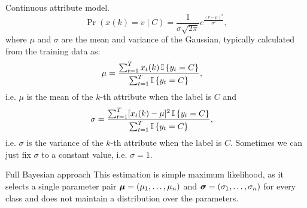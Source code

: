 \begin{frame}
  \begin{block}{Continuous attribute model.}
    \[
      \Pr(x(k) = v \mid C) = \frac{1}{\sigma \sqrt{2 \pi}} e^{\frac{(v -
          \mu)^2}{\sigma^2}},
    \]
    where $\mu$ and $\sigma$ are the mean and variance of the
    Gaussian, typically calculated from the training data as:
    \begin{align*}
      \mu &=   \frac{\sum_{t=1}^T x_t(k) \mathop{\mbox{\ensuremath{\mathbb{I}}}}\left\{y_t = C\right\}}
            {\sum_{t=1}^T \mathop{\mbox{\ensuremath{\mathbb{I}}}}\left\{y_t = C\right\}},
    \end{align*}
    i.e. $\mu$ is the mean of the $k$-th attribute when the label is
    $C$ and
    \begin{align*}
      \sigma &=   \frac{\sum_{t=1}^T [x_t(k) - \mu]^2 \mathop{\mbox{\ensuremath{\mathbb{I}}}}\left\{y_t = C\right\}}
               {\sum_{t=1}^T \mathop{\mbox{\ensuremath{\mathbb{I}}}}\left\{y_t = C\right\}},
    \end{align*}
    i.e. $\sigma$ is the variance of the $k$-th attribute when the
    label is $C$.  Sometimes we can just fix $\sigma$ to a constant
    value, i.e. $\sigma = 1$.
  \end{block}

  \begin{alertblock}{Full Bayesian approach}
    This estimation is simple maximum likelihood, as it selects a single parameter pair $\vectorsym{\mu} = (\mu_1, \ldots, \mu_n)$ and $\vectorsym{\sigma} = (\sigma_1, \ldots, \sigma_n)$ for every class and does not maintain a distribution over the parameters. 
  \end{alertblock}
\end{frame}

